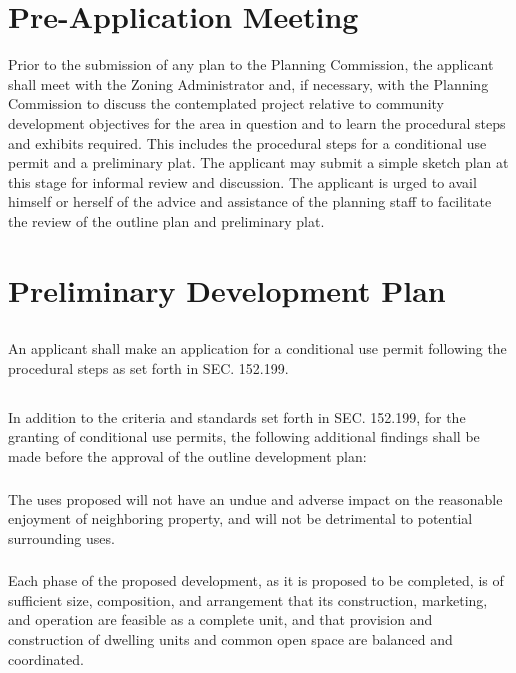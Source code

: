 \section{Pre-Application Meeting}
Prior to the submission of any plan to the Planning Commission, the applicant shall meet with the Zoning Administrator and, if necessary, with the Planning Commission to discuss the contemplated project relative to community development objectives for the area in question and to learn the procedural steps and exhibits required. This includes the procedural steps for a conditional use permit and a preliminary plat. The applicant may submit a simple sketch plan at this stage for informal review and discussion.  The applicant is urged to avail himself or herself of the advice and assistance of the planning staff to facilitate the review of the outline plan and preliminary plat.

\section{Preliminary Development Plan}
\subsection{}
An applicant shall make an application for a conditional use permit following the procedural steps as set forth in SEC. 152.199.
\subsection{}
In addition to the criteria and standards set forth in SEC. 152.199, for the granting of conditional use permits, the following additional findings shall be made before the approval of the outline development plan:
\subsubsection{}
The uses proposed will not have an undue and adverse impact on the reasonable enjoyment of neighboring property, and will not be detrimental to potential surrounding uses.
\subsubsection{}
\subsubsection{}
Each phase of the proposed development, as it is proposed to be completed, is of sufficient size, composition, and arrangement that its construction, marketing, and operation are feasible as a complete unit, and that provision and construction of dwelling units and common open space are balanced and coordinated.
